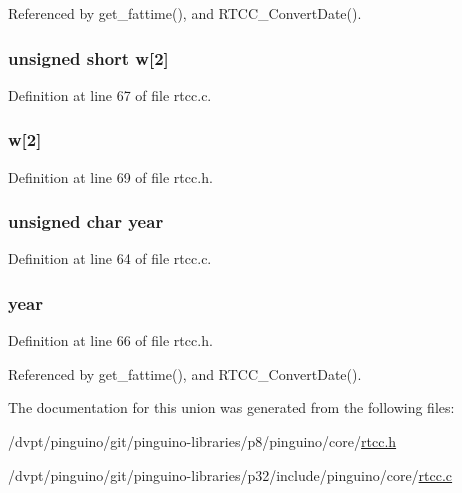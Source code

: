 Referenced by get\-\_\-fattime(), and R\-T\-C\-C\-\_\-\-Convert\-Date().

\hypertarget{unionrtcc_date_acd7a32916d80e0556e2e0348be16a805}{
\subsubsection[{w}]{\setlength{\rightskip}{0pt plus 5cm}unsigned short w\mbox{[}2\mbox{]}}}\label{unionrtcc_date_acd7a32916d80e0556e2e0348be16a805}


Definition at line 67 of file rtcc.\-c.

\hypertarget{unionrtcc_date_aee6ae13fa41deb7b244fe96f8b34be1d}{
\subsubsection[{w}]{ w\mbox{[}2\mbox{]}}}\label{unionrtcc_date_aee6ae13fa41deb7b244fe96f8b34be1d}


Definition at line 69 of file rtcc.\-h.

\hypertarget{unionrtcc_date_a189605ebe7fb094d2d8d511d855c4bb0}{
\subsubsection[{year}]{\setlength{\rightskip}{0pt plus 5cm}unsigned char year}}\label{unionrtcc_date_a189605ebe7fb094d2d8d511d855c4bb0}


Definition at line 64 of file rtcc.\-c.

\hypertarget{unionrtcc_date_ab02bacda75d48acac498f0c9f4e9b1cf}{
\subsubsection[{year}]{ year}}\label{unionrtcc_date_ab02bacda75d48acac498f0c9f4e9b1cf}


Definition at line 66 of file rtcc.\-h.



Referenced by get\-\_\-fattime(), and R\-T\-C\-C\-\_\-\-Convert\-Date().



The documentation for this union was generated from the following files\-:\begin{DoxyCompactItemize}
\item 
/dvpt/pinguino/git/pinguino-\/libraries/p8/pinguino/core/\hyperlink{rtcc_8h}{rtcc.\-h}\item 
/dvpt/pinguino/git/pinguino-\/libraries/p32/include/pinguino/core/\hyperlink{p32_2include_2pinguino_2core_2rtcc_8c}{rtcc.\-c}\end{DoxyCompactItemize}
